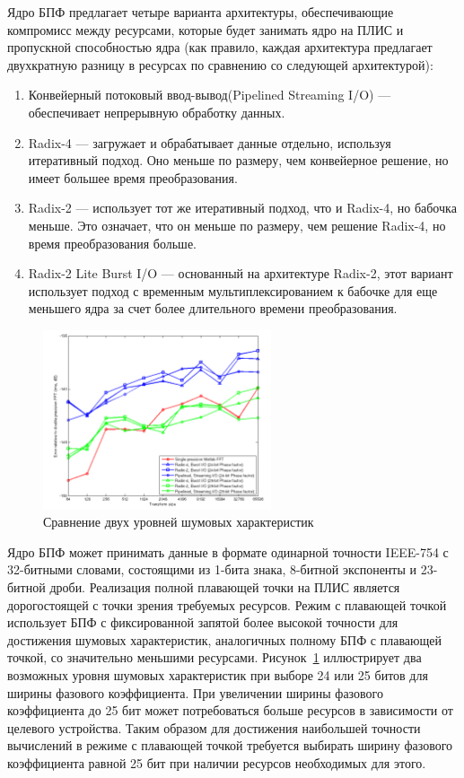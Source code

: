 Ядро БПФ предлагает четыре варианта архитектуры, обеспечивающие компромисс между ресурсами, которые будет занимать ядро на ПЛИС и пропускной способностью ядра (как правило, каждая архитектура предлагает двухкратную разницу в ресурсах по сравнению со следующей архитектурой): 

\begin{enumerate}
	\item Конвейерный потоковый ввод-вывод(Pipelined Streaming I/O) — обеспечивает непрерывную обработку данных. 
	\item Radix-4 — загружает и обрабатывает данные отдельно, используя итеративный подход. Оно меньше по размеру, чем конвейерное решение, но имеет большее время преобразования. 
	\item Radix-2 — использует тот же итеративный подход, что и Radix-4, но бабочка меньше. Это означает, что он меньше по размеру, чем решение Radix-4, но время преобразования больше. 
	\item Radix-2 Lite Burst I/O — основанный на архитектуре Radix-2, этот вариант использует подход с временным мультиплексированием к бабочке для еще меньшего ядра за счет более длительного времени преобразования.
\end{enumerate} 

\begin{figure}[h]
	\centering
	\includegraphics[width=0.6\textwidth]{image/fft_xilinx_fp.png}
	\caption{Сравнение двух уровней шумовых характеристик}
	\label{fft_xilinx_fp}
\end{figure}

Ядро БПФ может принимать данные в формате одинарной точности IEEE-754 с 32-битными словами, состоящими из 1-бита знака, 8-битной экспоненты и 23-битной дроби. Реализация полной плавающей точки на ПЛИС является дорогостоящей с точки зрения требуемых ресурсов. Режим с плавающей точкой использует БПФ с фиксированной запятой более высокой точности для достижения шумовых характеристик, аналогичных полному БПФ с плавающей точкой, со значительно меньшими ресурсами. Рисунок~\ref{fft_xilinx_fp} иллюстрирует два возможных уровня шумовых характеристик при выборе 24 или 25 битов для ширины фазового коэффициента. При увеличении ширины фазового коэффициента до 25 бит может потребоваться больше ресурсов в зависимости от целевого устройства. Таким образом для достижения наибольшей точности вычислений в режиме с плавающей точкой требуется выбирать ширину фазового коэффициента равной 25 бит при наличии ресурсов необходимых для этого.

